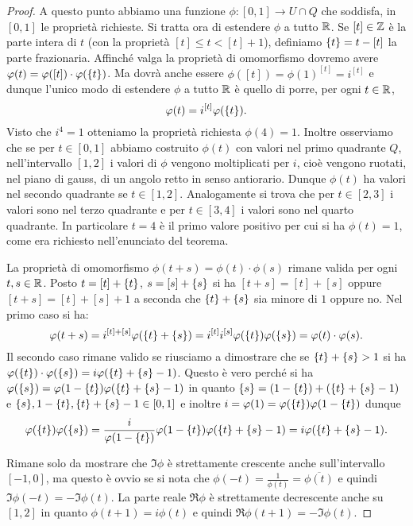 \begin{proof}
A questo punto abbiamo una funzione $\phi\colon[0,1]\to U\cap Q$ 
che soddisfa, in $[0,1]$ le proprietà richieste.
Si tratta ora di estendere $\phi$ a tutto ${\mathbb R}$.
Se $[t]\in {\mathbb Z}$ è la parte intera di $t$ (con la proprietà 
$[t]\le t < [t]+1$), definiamo ${\left\{ t \right\}} = t-[t]$
la parte frazionaria. 
Affinché valga la proprietà
di omomorfismo dovremo avere $\varphi(t)=\varphi([t])\cdot\varphi({\left\{ t \right\}})$.
Ma dovrà anche essere $\phi([t])=\phi(1)^{[t]}=i^{[t]}$ e dunque
l'unico modo di estendere $\phi$ a tutto ${\mathbb R}$ è quello di porre,
per ogni $t\in {\mathbb R}$,
\[
  \varphi(t) = i^{[t]}\varphi({\left\{ t \right\}}).
\]
Visto che $i^4=1$ otteniamo la proprietà richiesta $\phi(4)=1$.
Inoltre osserviamo che se per $t\in[0,1]$ abbiamo costruito 
$\phi(t)$ con valori nel primo quadrante $Q$, nell'intervallo $[1,2]$
i valori di $\phi$ vengono moltiplicati per $i$, cioè vengono 
ruotati, nel piano di gauss, di un angolo retto in senso antiorario.
Dunque $\phi(t)$ ha valori nel secondo quadrante se $t\in[1,2]$.
Analogamente si trova che per $t\in[2,3]$ i valori sono nel terzo 
quadrante e per $t\in[3,4]$ i valori sono nel quarto quadrante.
In particolare $t=4$ è il primo valore positivo per cui si ha 
$\phi(t)=1$, come era richiesto nell'enunciato del teorema.

La proprietà di omomorfismo $\phi(t+s)=\phi(t)\cdot\phi(s)$ 
rimane valida per ogni $t,s\in{\mathbb R}$.
Posto $t=[t]+{\left\{ t \right\}}$, $s=[s]+{\left\{ s \right\}}$ si ha 
$[t+s]=[t]+[s]$ oppure $[t+s]=[t]+[s]+1$ a seconda che 
${\left\{ t \right\}}+{\left\{ s \right\}}$ sia minore di $1$ oppure no.
Nel primo caso si ha:
\[
\varphi(t+s) = i^{[t]+[s]}\varphi({\left\{ t \right\}}+{\left\{ s \right\}})
  = i^{[t]}i^{[s]}\varphi({\left\{ t \right\}})\varphi({\left\{ s \right\}})
  = \varphi(t)\cdot\varphi(s).
\]
Il secondo caso rimane valido se riusciamo a dimostrare che 
se ${\left\{ t \right\}}+{\left\{ s \right\}}>1$ si ha 
$\varphi({\left\{ t \right\}})\cdot \varphi({\left\{ s \right\}}) = i\varphi({\left\{ t \right\}}+{\left\{ s \right\}}-1)$.
Questo è vero perché si ha
$\varphi({\left\{ s \right\}})=\varphi(1-{\left\{ t \right\}})\varphi({\left\{ t \right\}}+{\left\{ s \right\}}-1)$ in quanto 
${\left\{ s \right\}}=(1-{\left\{ t \right\}})+({\left\{ t \right\}}+{\left\{ s \right\}}-1)$ 
e ${\left\{ s \right\}},1-{\left\{ t \right\}},{\left\{ t \right\}}+{\left\{ s \right\}}-1\in[0,1]$
e inoltre $i=\varphi(1)=\varphi({\left\{ t \right\}})\varphi(1-{\left\{ t \right\}})$
dunque 
\[
\varphi({\left\{ t \right\}})\varphi({\left\{ s \right\}}) 
  = \frac{i}{\varphi(1-{\left\{ t \right\}})}\varphi(1-{\left\{ t \right\}})\varphi({\left\{ t \right\}}+{\left\{ s \right\}}-1)
  = i \varphi({\left\{ t \right\}}+{\left\{ s \right\}}-1).
\]

Rimane solo da mostrare che $\Im \phi$ è strettamente crescente anche 
sull'intervallo $[-1,0]$, ma questo è ovvio se si nota che 
$\phi(-t)=\frac{1}{\phi(t)}=\overline{\phi(t)}$ 
e quindi $\Im \phi(-t)=-\Im \phi(t)$.
La parte reale $\Re \phi$ è strettamente decrescente anche su $[1,2]$
in quanto $\phi(t+1)=i\phi(t)$ e quindi $\Re \phi(t+1)=-\Im \phi(t)$.
\end{proof}

